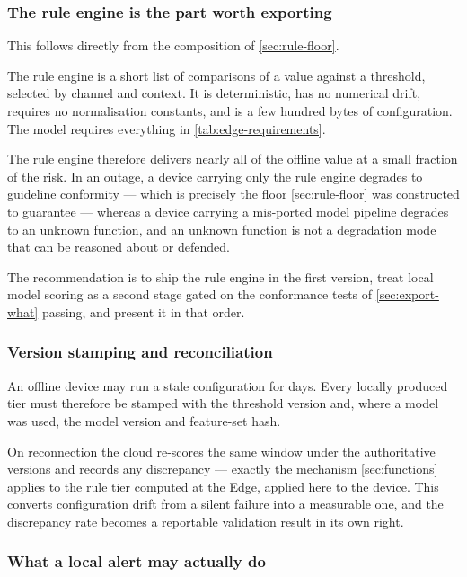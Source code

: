 \documentclass[12pt,a4paper,oneside]{report}
\begin{document}
\subsubsection{The rule engine is the part worth exporting}\label{sec:rule-export}

This follows directly from the composition of \cref{sec:rule-floor}.

The rule engine is a short list of comparisons of a value against a threshold, selected by channel and context. It is deterministic, has no numerical drift, requires no normalisation constants, and is a few hundred bytes of configuration. The model requires everything in \cref{tab:edge-requirements}.

The rule engine therefore delivers nearly all of the offline value at a small fraction of the risk. In an outage, a device carrying only the rule engine degrades to guideline conformity --- which is precisely the floor \cref{sec:rule-floor} was constructed to guarantee --- whereas a device carrying a mis-ported model pipeline degrades to an unknown function, and an unknown function is not a degradation mode that can be reasoned about or defended.

The recommendation is to ship the rule engine in the first version, treat local model scoring as a second stage gated on the conformance tests of \cref{sec:export-what} passing, and present it in that order.

\subsubsection{Version stamping and reconciliation}\label{sec:version-stamp}

An offline device may run a stale configuration for days. Every locally produced tier must therefore be stamped with the threshold version and, where a model was used, the model version and feature-set hash.

On reconnection the cloud re-scores the same window under the authoritative versions and records any discrepancy --- exactly the mechanism \cref{sec:functions} applies to the rule tier computed at the Edge, applied here to the device. This converts configuration drift from a silent failure into a measurable one, and the discrepancy rate becomes a reportable validation result in its own right.

\subsubsection{What a local alert may actually do}\label{sec:local-alert}
\end{document}
